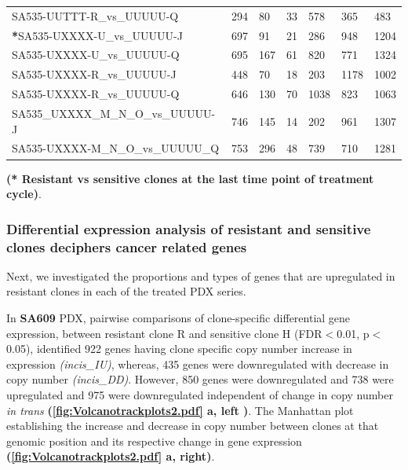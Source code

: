 \begin{landscape}
\begin{table}
{\begin{tabular}{|l|p{3.8em}|p{3.8em}|p{3.8em}|p{3.8em}|p{3.8em}|p{3.8em}|}
SA535-UUTTT-R\_vs\_UUUUU-Q         & 294 & 80  & 33  & 578  & 365  & 483  \\
\textbf{*}SA535-UXXXX-U\_vs\_UUUUU-J         & 697 & 91  & 21  & 286  & 948  & 1204 \\
SA535-UXXXX-U\_vs\_UUUUU-Q         & 695 & 167 & 61  & 820  & 771  & 1324 \\
SA535-UXXXX-R\_vs\_UUUUU-J         & 448 & 70  & 18  & 203  & 1178 & 1002 \\
SA535-UXXXX-R\_vs\_UUUUU-Q         & 646 & 130 & 70  & 1038 & 823  & 1063 \\
SA535\_UXXXX\_M\_N\_O\_vs\_UUUUU-J & 746 & 145 & 14  & 202  & 961  & 1307 \\
SA535-UXXXX-M\_N\_O\_vs\_UUUUU\_Q  & 753 & 296 & 48  & 739  & 710  & 1281 \\
  \hline

\end{tabular}
}

\label{tab:numberofDEgenesincistrans}

  \small\textbf{(* Resistant vs sensitive clones at the last time point of treatment cycle)}.
\end{table}
\end{landscape}




 \subsubsection{Differential expression analysis of resistant and sensitive clones deciphers cancer related genes}
 Next, we investigated the proportions and types of genes that are upregulated in resistant clones in each of the treated PDX series.
 
 In \textbf{SA609} PDX, pairwise comparisons of clone-specific differential gene expression, between resistant clone R and sensitive clone H (FDR$<$0.01, p$<$0.05), identified 922 genes having clone specific copy number increase in expression \textit{(incis\_IU)}, whereas, 435 genes were downregulated with decrease in copy number \textit{(incis\_DD)}. However, 850 genes were downregulated and 738 were upregulated and 975 were downregulated independent of change in copy number \textit{in trans} \textbf{(\autoref{fig:Volcanotrackplots2.pdf} a, left )}. The Manhattan plot establishing the increase and decrease in copy number between clones at that genomic position and its respective change in gene expression \textbf{(\autoref{fig:Volcanotrackplots2.pdf} a, right)}.
 
